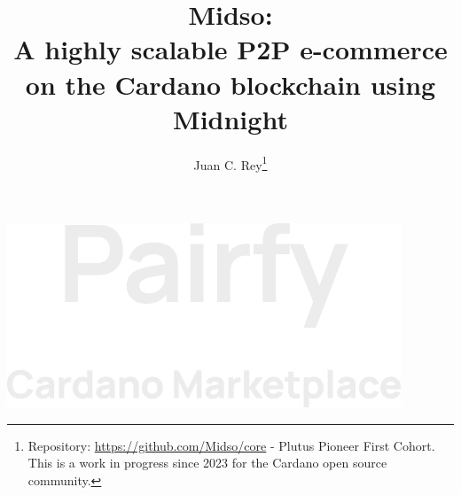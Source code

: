 \documentclass[12pt]{article}
\begin{document}
\newpage

\pagecolor{blueColor}

\begin{titlepage}
    \centering

     \includegraphics[width=0.88\textwidth, keepaspectratio]{latex-cover.png}
    
\end{titlepage}

\newpage

\pagecolor{white}

\renewenvironment{abstract}
 {\small
  \begin{center}
  \bfseries \abstractname\vspace{-.5em}\vspace{0pt}
  \end{center}
  \list{}{
    \setlength{\leftmargin}{.5cm}
    \setlength{\rightmargin}{\leftmargin}
  }
  \item\relax}
 {\endlist}
 

\title{\textbf{Midso:\\A highly scalable P2P e-commerce on the Cardano blockchain using Midnight }}

\author{Juan C. Rey\footnote{Repository: \url{https://github.com/Midso/core} - Plutus Pioneer First Cohort. This is a work in progress since 2023 for the Cardano open source community.  }\\} 

\maketitle

\renewcommand*\abstractname{\textbf{}\hfill}
\end{document}
